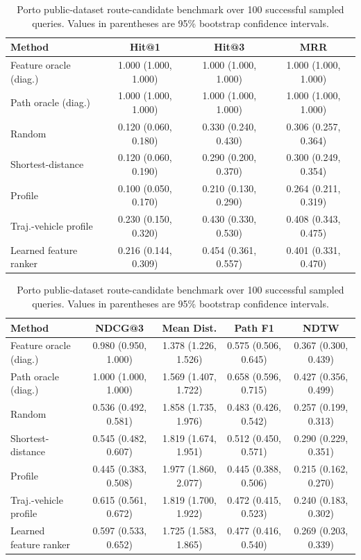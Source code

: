 \begin{table}[t]
  \centering
  \caption{Porto public-dataset route-candidate benchmark over 100 successful sampled queries. Values in parentheses are 95\% bootstrap confidence intervals.}
  \label{tab:porto_results}
  \begin{tabular}{lccc}
    \toprule
    Method & Hit@1 & Hit@3 & MRR \\
    \midrule
    Feature oracle (diag.) & 1.000 (1.000, 1.000) & 1.000 (1.000, 1.000) & 1.000 (1.000, 1.000) \\
    Path oracle (diag.) & 1.000 (1.000, 1.000) & 1.000 (1.000, 1.000) & 1.000 (1.000, 1.000) \\
    Random & 0.120 (0.060, 0.180) & 0.330 (0.240, 0.430) & 0.306 (0.257, 0.364) \\
    Shortest-distance & 0.120 (0.060, 0.190) & 0.290 (0.200, 0.370) & 0.300 (0.249, 0.354) \\
    Profile & 0.100 (0.050, 0.170) & 0.210 (0.130, 0.290) & 0.264 (0.211, 0.319) \\
    Traj.-vehicle profile & 0.230 (0.150, 0.320) & 0.430 (0.330, 0.530) & 0.408 (0.343, 0.475) \\
    Learned feature ranker & 0.216 (0.144, 0.309) & 0.454 (0.361, 0.557) & 0.401 (0.331, 0.470) \\
    \bottomrule
  \end{tabular}

  \vspace{0.5em}
  \begin{tabular}{lcccc}
    \toprule
    Method & NDCG@3 & Mean Dist. & Path F1 & NDTW \\
    \midrule
    Feature oracle (diag.) & 0.980 (0.950, 1.000) & 1.378 (1.226, 1.526) & 0.575 (0.506, 0.645) & 0.367 (0.300, 0.439) \\
    Path oracle (diag.) & 1.000 (1.000, 1.000) & 1.569 (1.407, 1.722) & 0.658 (0.596, 0.715) & 0.427 (0.356, 0.499) \\
    Random & 0.536 (0.492, 0.581) & 1.858 (1.735, 1.976) & 0.483 (0.426, 0.542) & 0.257 (0.199, 0.313) \\
    Shortest-distance & 0.545 (0.482, 0.607) & 1.819 (1.674, 1.951) & 0.512 (0.450, 0.571) & 0.290 (0.229, 0.351) \\
    Profile & 0.445 (0.383, 0.508) & 1.977 (1.860, 2.077) & 0.445 (0.388, 0.506) & 0.215 (0.162, 0.270) \\
    Traj.-vehicle profile & 0.615 (0.561, 0.672) & 1.819 (1.700, 1.922) & 0.472 (0.415, 0.523) & 0.240 (0.183, 0.302) \\
    Learned feature ranker & 0.597 (0.533, 0.652) & 1.725 (1.583, 1.865) & 0.477 (0.416, 0.540) & 0.269 (0.203, 0.339) \\
    \bottomrule
  \end{tabular}
\end{table}

